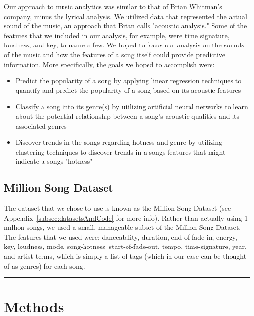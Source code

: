 \documentclass[12pt]{article}
\newcommand{\horizontalLine}{
	\begin{center}
		\hrule width 1.0\textwidth
	\end{center}
}
\begin{document}
Our approach to music analytics was similar to that of Brian Whitman's company, minus the lyrical analysis. We utilized data that represented the actual sound of the music, an approach that Brian calls "acoustic analysis." Some of the features that we included in our analysis, for example, were time signature, loudness, and key, to name a few. We hoped to focus our analysis on the sounds of the music and how the features of a song itself could provide predictive information. More specifically, the goals we hoped to accomplish were:
\vspace{-3.5mm}
\begin{itemize}
    \item Predict the popularity of a song by applying linear regression techniques to quantify and predict the popularity of a song based on its acoustic features
    \vspace{-3.5mm}
    \item Classify a song into its genre(s) by utilizing artificial neural networks to learn about the potential relationship between a song's acoustic qualities and its associated genres 
    \vspace{-3.5mm}
    \item Discover trends in the songs regarding hotness and genre by utilizing clustering techniques to discover trends in a songs features that might indicate a songs "hotness"
    \vspace{-3.5mm}
\end{itemize}
\subsection{Million Song Dataset}
\label{subsec:datasetIntro}
The dataset that we chose to use is known as the Million Song Dataset (see Appendix~\ref{subsec:datasetsAndCode} for more info). Rather than actually using 1 million songs, we used a small, manageable subset of the Million Song Dataset. The features that we used were: danceability, duration, end-of-fade-in, energy, key, loudness, mode, song-hotness, start-of-fade-out, tempo, time-signature, year, and artist-terms, which is simply a list of tags (which in our case can be thought of as genres) for each song.
\horizontalLine
\section{Methods}
\label{sec:methods}
\end{document}
